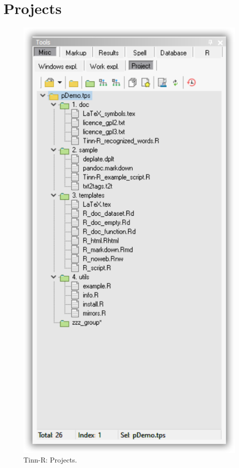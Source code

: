 
\hypertarget{working_projects}{}
\section{Projects}

\begin{figure}[H]
  \begin{center}
    \includegraphics[scale=0.60]{./res/tools_misc_project.png}
  \end{center}
  \caption{Tinn-R: Projects.}
  \label{fig:tinn-r_projects}
\end{figure}

